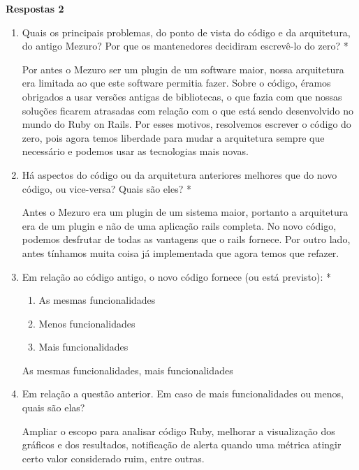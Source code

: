 \textbf{Respostas 2}

\begin{enumerate}
\item Quais os principais problemas, do ponto de vista do código e da arquitetura, do antigo Mezuro? Por que os mantenedores decidiram escrevê-lo do zero? *
  \begin{mdframed}
Por antes o Mezuro ser um plugin de um software maior, nossa arquitetura era limitada ao que este software permitia fazer. Sobre o código, éramos obrigados a usar versões antigas de bibliotecas, o que fazia com que nossas soluções ficarem atrasadas com relação com o que está sendo desenvolvido no mundo do Ruby on Rails.
Por esses motivos, resolvemos escrever o código do zero, pois agora temos liberdade para mudar a arquitetura sempre que necessário e podemos usar as tecnologias mais novas.
  \end{mdframed}
\item Há aspectos do código ou da arquitetura anteriores melhores que do novo código, ou vice-versa? Quais são eles? *
  \begin{mdframed}
Antes o Mezuro era um plugin de um sistema maior, portanto a arquitetura era de um plugin e não de uma aplicação rails completa. No novo código, podemos desfrutar de todas as vantagens que o rails fornece. Por outro lado, antes tínhamos muita coisa já implementada que agora temos que refazer.
  \end{mdframed}
\item Em relação ao código antigo, o novo código fornece (ou está previsto): *
  \begin{enumerate}
  \item As mesmas funcionalidades
  \item Menos funcionalidades
  \item Mais funcionalidades 
  \end{enumerate}
    \begin{mdframed}
As mesmas funcionalidades, mais funcionalidades
    \end{mdframed}
\item Em relação a questão anterior. Em caso de mais funcionalidades ou menos, quais são elas? 
  \begin{mdframed}
Ampliar o escopo para analisar código Ruby, melhorar a visualização dos gráficos e dos resultados, notificação de alerta quando uma métrica atingir certo valor considerado ruim, entre outras.
  \end{mdframed}
\end{enumerate}

